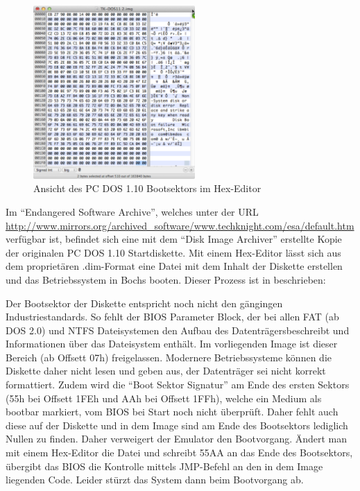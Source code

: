 	\begin{figure}[h]
		\begin{center}
			\includegraphics[width=0.55\textwidth]{img/DOS110hex}
			\caption{Ansicht des PC DOS 1.10 Bootsektors im Hex-Editor}
			\label{fig:screenshot-hexeditor110}
		\end{center}
	\end{figure}

	Im "`Endangered Software Archive"', welches unter der URL \url{http://www.mirrors.org/archived_software/www.techknight.com/esa/default.htm} verfügbar ist, befindet sich eine mit dem "`Disk Image Archiver"' erstellte Kopie der originalen PC DOS 1.10 Startdiskette. 
	Mit einem Hex-Editor lässt sich aus dem proprietären .dim-Format eine Datei mit dem Inhalt der Diskette erstellen und das Betriebssystem in Bochs booten.
	Dieser Prozess ist in \cite{PCMinistry} beschrieben:

	Der Bootsektor der Diskette entspricht noch nicht den gängingen Industriestandards.
	So fehlt der BIOS Parameter Block, der bei allen FAT (ab DOS 2.0) und NTFS Dateisystemen den Aufbau des Datenträgersbeschreibt und Informationen über das Dateisystem enthält. Im vorliegenden Image ist dieser Bereich (ab Offsett 07h) freigelassen.
	Modernere Betriebssysteme können die Diskette daher nicht lesen und geben aus, der Datenträger sei nicht korrekt formattiert. 
	Zudem wird die "`Boot Sektor Signatur"' am Ende des ersten Sektors (55h bei Offsett 1FEh und AAh bei Offsett 1FFh), welche ein Medium als bootbar markiert, vom BIOS bei Start noch nicht überprüft. \cite{IBMTechRef} Daher fehlt auch diese auf der Diskette und in dem Image sind am Ende des Bootsektors lediglich Nullen zu finden.
	Daher verweigert der Emulator den Bootvorgang.
	Ändert man mit einem Hex-Editor die Datei und schreibt 55AA an das Ende des Bootsektors, übergibt das BIOS die Kontrolle mittels JMP-Befehl an den in dem Image liegenden Code. Leider stürzt das System dann beim Bootvorgang ab.

